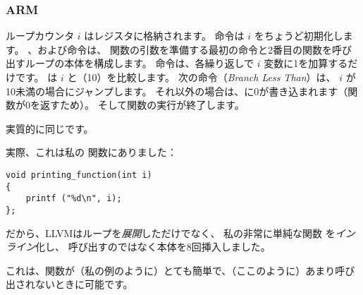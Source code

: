 ﻿\subsubsection{ARM}

\myparagraph{\NonOptimizingKeilVI (\ARMMode)}



ループカウンタ $i$ はレジスタに格納されます。
命令は $i$ をちょうど初期化します。 
、および命令は、
\ttf 関数の引数を準備する最初の命令と2番目の関数を呼び出すループの本体を構成します。 
命令は、各繰り返しで $i$ 変数に1を加算するだけです。 
は $i$ と（10）を比較します。 
次の命令（\emph{Branch Less Than}）は、 $i$ が10未満の場合にジャンプします。
それ以外の場合は、に0が書き込まれます（関数が0を返すため）。
そして関数の実行が終了します。

\myparagraph{\OptimizingKeilVI (\ThumbMode)}



実質的に同じです。

\myparagraph{\OptimizingXcodeIV (\ThumbTwoMode)}
\label{ARM_unrolled_loops}



実際、これは私の \ttf 関数にありました：

\begin{lstlisting}[style=customc]
void printing_function(int i)
{
    printf ("%d\n", i);
};
\end{lstlisting}

だから、LLVMはループを\emph{展開}しただけでなく、
私の非常に単純な関数 \ttf を\emph{インライン}化し、
呼び出すのではなく本体を8回挿入しました。

これは、関数が（私の例のように）とても簡単で、（ここのように）あまり呼び出されないときに可能です。






